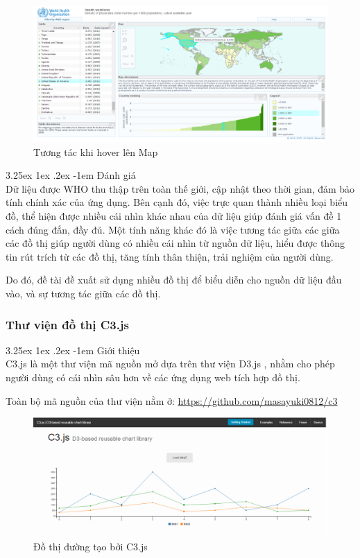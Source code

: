 \documentclass[12pt,a4paper]{article}
\makeatletter
\newcommand{\myparagraph}[1]{\paragraph{#1}\mbox{}\\} %
\renewcommand\paragraph{\@startsection{paragraph}{5}{\z@}%
  {3.25ex \@plus1ex \@minus.2ex}%
  {-1em}%
  {\normalfont\normalsize\bfseries}}
\makeatother
\begin{document}
\begin{figure}[!h]
    \begin{center}
    \includegraphics[scale=.4]{image/hoveratlas}
    \caption{Tương tác khi hover lên Map}
    \label{fig:hoveratlas}
    \end{center}
\end{figure}

\myparagraph{Đánh giá}
Dữ liệu được WHO thu thập trên toàn thế giới, cập nhật theo thời gian, đảm bảo tính chính xác của ứng dụng. Bên cạnh đó, việc trực quan thành nhiều loại biểu đồ, thể hiện được nhiều cái nhìn khác nhau của dữ liệu giúp đánh giá vấn đề 1 cách đúng đắn, đầy đủ. Một tính năng khác đó là việc tương tác giữa các giữa các đồ thị giúp người dùng có nhiều cái nhìn từ nguồn dữ liệu, hiểu được thông tin rút trích từ các đồ thị, tăng tính thân thiện, trải nghiệm của người dùng.

Do đó, đề tài đề xuất sử dụng nhiều đồ thị để biểu diễn cho nguồn dữ liệu đầu vào, và sự tương tác giữa các đồ thị.
\subsubsection{Thư viện đồ thị C3.js}\label{sec:c3js}
\myparagraph{Giới thiệu}
C3.js là một thư viện mã nguồn mở \cite{c3js} dựa trên thư viện D3.js , nhằm cho phép người dùng có cái nhìn sâu hơn về các ứng dụng web tích hợp đồ thị.

Toàn bộ mã nguồn của thư viện nằm ở: \url{https://github.com/masayuki0812/c3}
\begin{figure}[!h]
	\begin{center}
    \includegraphics[scale=.4]{image/c3js}
    \caption{Đồ thị đường tạo bởi C3.js}
    \label{fig:c3js}
	\end{center}
\end{figure}
\end{document}
